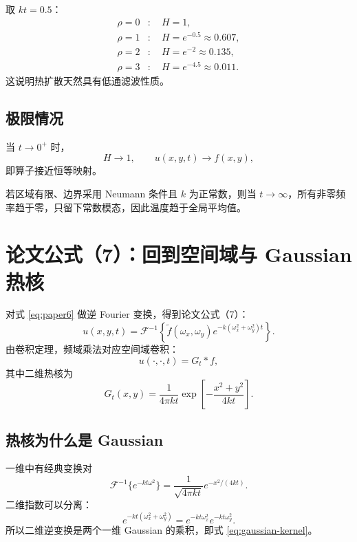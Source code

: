 \documentclass[UTF8,12pt,a4paper,fontset=none]{ctexart}
\numberwithin{equation}{section}
\newcommand{\IFT}{\mathcal{F}^{-1}}
\begin{document}
\begin{examplebox}[不同频率的衰减]
取 $kt=0.5$：
\begin{align}
  \rho=0&:\quad H=1,\\
  \rho=1&:\quad H=e^{-0.5}\approx0.607,\\
  \rho=2&:\quad H=e^{-2}\approx0.135,\\
  \rho=3&:\quad H=e^{-4.5}\approx0.011.
\end{align}
这说明热扩散天然具有低通滤波性质。
\end{examplebox}

\subsection{极限情况}

当 $t\to0^+$ 时，
\begin{equation}
  H\to1,
  \qquad u(x,y,t)\to f(x,y),
\end{equation}
即算子接近恒等映射。

若区域有限、边界采用 Neumann 条件且 $k$ 为正常数，则当 $t\to\infty$，所有非零频率趋于零，只留下常数模态，因此温度趋于全局平均值。

\section{论文公式（7）：回到空间域与 Gaussian 热核}

对式 \eqref{eq:paper6} 做逆 Fourier 变换，得到论文公式（7）：
\begin{equation}
  u(x,y,t)
  =\IFT\left\{
  \widetilde f(\omega_x,\omega_y)
  e^{-k(\omega_x^2+\omega_y^2)t}
  \right\}.
  \tag{7}
  \label{eq:paper7}
\end{equation}
由卷积定理，频域乘法对应空间域卷积：
\begin{equation}
  u(\cdot,\cdot,t)=G_t*f,
  \label{eq:convolution-form}
\end{equation}
其中二维热核为
\begin{equation}
  G_t(x,y)
  =\frac{1}{4\pi kt}
  \exp\left[-\frac{x^2+y^2}{4kt}\right].
  \label{eq:gaussian-kernel}
\end{equation}

\subsection{热核为什么是 Gaussian}

一维中有经典变换对
\begin{equation}
  \IFT\{e^{-kt\omega^2}\}
  =\frac{1}{\sqrt{4\pi kt}}
  e^{-x^2/(4kt)}.
\end{equation}
二维指数可以分离：
\begin{equation}
  e^{-kt(\omega_x^2+\omega_y^2)}
  =e^{-kt\omega_x^2}e^{-kt\omega_y^2}.
\end{equation}
所以二维逆变换是两个一维 Gaussian 的乘积，即式 \eqref{eq:gaussian-kernel}。
\end{document}
